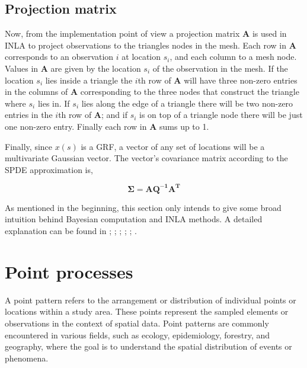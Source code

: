 \documentclass[
]{book}
\begin{document}
\hypertarget{projection-matrix}{%
\subsection*{Projection matrix}\label{projection-matrix}}

Now, from the implementation point of view a projection matrix \(\mathbf{A}\) is used in INLA to project observations to the triangles nodes in the mesh. Each row in \(\mathbf{A}\) corresponds to an observation \(i\) at location \(s_i\), and each column to a mesh node. Values in \(\mathbf{A}\) are given by the location \(s_i\) of the observation in the mesh. If the location \(s_i\) lies inside a triangle the \(i\)th row of \(\mathbf{A}\) will have three non-zero entries in the columns of \(\mathbf{A}\) corresponding to the three nodes that construct the triangle where \(s_i\) lies in. If \(s_i\) lies along the edge of a triangle there will be two non-zero entries in the \(i\)th row of \(\mathbf{A}\); and if \(s_i\) is on top of a triangle node there will be just one non-zero entry. Finally each row in \(\mathbf{A}\) sums up to 1.

Finally, since \(x(s)\) is a GRF, a vector of any set of locations will be a multivariate Gaussian vector. The vector's covariance matrix according to the SPDE approximation is,

\[\mathbf{\Sigma}=\mathbf{AQ^{-1}A^{T}}\]

As mentioned in the beginning, this section only intends to give some broad intuition behind Bayesian computation and INLA methods. A detailed explanation can be found in \citet{bakka_non-stationary_2019}; \citet{krainski_advanced_2018}; \citet{lindgren_explicit_2011}; \citet{rue_approximate_2009}; \citet{rue_gaussian_2005}; \citet{simpson_going_2016}.

\hypertarget{point-processes}{%
\section*{Point processes}\label{point-processes}}

A point pattern refers to the arrangement or distribution of individual points or locations within a study area. These points represent the sampled elements or observations in the context of spatial data. Point patterns are commonly encountered in various fields, such as ecology, epidemiology, forestry, and geography, where the goal is to understand the spatial distribution of events or phenomena.
\end{document}
